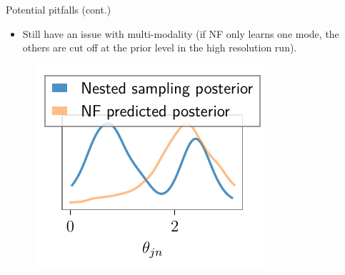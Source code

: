 \documentclass[aspectratio=169, 11pt]{beamer}
\begin{document}
\begin{frame}{Potential pitfalls (cont.)}
\vspace{2em}
    \begin{itemize}
    \item Still have an issue with multi-modality (if NF only learns one mode, the others are cut off at the prior level in the high resolution run).
\end{itemize}

    \begin{figure}
        \centering
        \includegraphics[]{Ca_Foscari Beamer/presentation_multimodality.pdf}
    \end{figure}
\end{frame}
\end{document}
